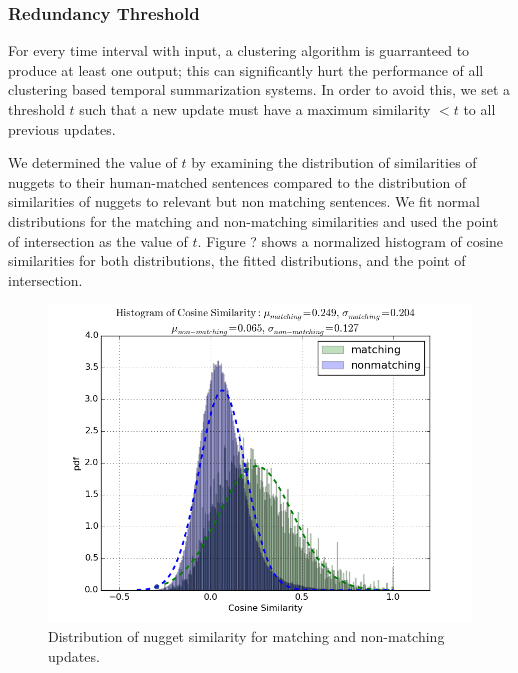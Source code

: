 \subsubsection{Redundancy Threshold}

For every time interval with input, a clustering algorithm is
guarranteed to produce at least one output; 
this can significantly hurt the performance of all clustering based 
temporal summarization systems. In order to avoid this, we set a threshold $t$
such that a new update must have a maximum similarity $< t$ to all previous 
updates.

We determined the value of $t$ by examining the distribution of similarities
of nuggets to their human-matched sentences compared to the distribution
of similarities of nuggets to relevant but non matching sentences. We fit
normal distributions for the matching and non-matching similarities and
used the point of intersection as the value of $t$.
Figure ? shows a normalized histogram of cosine similarities for both 
distributions, the fitted distributions, and the point of intersection.

\begin{figure}
\includegraphics[scale=.40]{match-dist.png} 
\caption{Distribution of nugget similarity for matching and non-matching 
updates.}
\end{figure}

